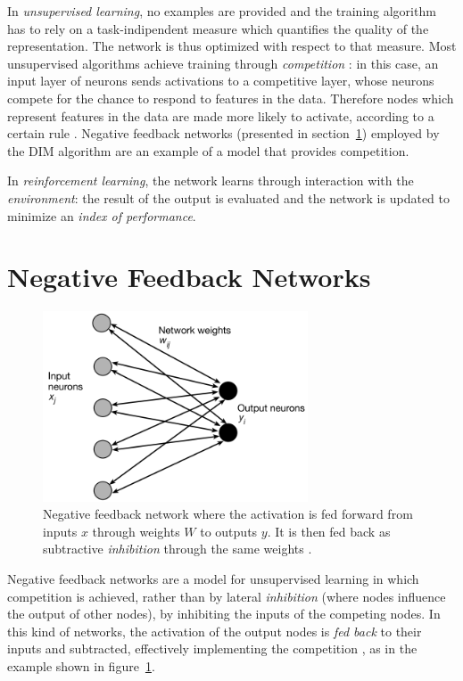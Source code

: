 \documentclass[11pt,a4paper]{report}
\begin{document}
				In \emph{unsupervised learning}, no examples are provided and the training algorithm has to rely on a task-indipendent measure which quantifies the quality of the representation. The network is thus optimized with respect to that measure. Most unsupervised algorithms achieve training through \emph{competition} \cite{spratling2009unsupervised}: in this case, an input layer of neurons sends activations to a competitive layer, whose neurons compete for the chance to respond to features in the data. Therefore nodes which represent features in the data are made more likely to activate, according to a certain rule \cite{haykin2009neural}. Negative feedback networks (presented in section~\ref{sec:negfeedback}) employed by the DIM algorithm are an example of a model that provides competition.
				
				In \emph{reinforcement learning}, the network learns through interaction with the \emph{environment}: the result of the output is evaluated and the network is updated to minimize an \emph{index of performance}.	
		
		\newpage		
		
		\section{Negative Feedback Networks}
			\label{sec:negfeedback}
			\begin{figure}[h]
				\centering
				\includegraphics[width=0.7\textwidth]{negfeedback}
				\caption[Negative feedback network.]{Negative feedback network where the activation is fed forward from inputs $x$ through weights $W$ to outputs $y$. It is then fed back as subtractive \emph{inhibition} through the same weights \cite{charles1998modelling}.}
				\label{fig:negfeedback}
			\end{figure}
			Negative feedback networks are a model for unsupervised learning in which competition is achieved, rather than by lateral \emph{inhibition} (where nodes influence the output of other nodes), by inhibiting the inputs of the competing nodes. In this kind of networks, the activation of the output nodes is \emph{fed back} to their inputs and subtracted, effectively implementing the competition \cite{spratling2009unsupervised}, as in the example shown in figure~\ref{fig:negfeedback}.
		
\end{document}
